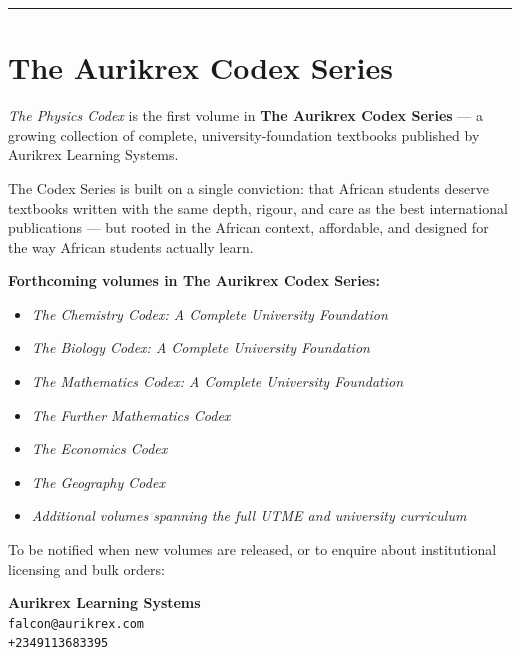 \vspace{1cm}
\color{codexblue}\rule{\textwidth}{0.5pt}
\vspace{0.5cm}


\section*{The Aurikrex Codex Series}

\textit{The Physics Codex} is the first volume in
\textbf{The Aurikrex Codex Series} --- a growing collection
of complete, university-foundation textbooks published by
Aurikrex Learning Systems.

The Codex Series is built on a single conviction: that
African students deserve textbooks written with the same
depth, rigour, and care as the best international publications
--- but rooted in the African context, affordable, and
designed for the way African students actually learn.

\vspace{0.3cm}

\textbf{Forthcoming volumes in The Aurikrex Codex Series:}

\begin{itemize}
  \item \textit{The Chemistry Codex: A Complete University
  Foundation}
  \item \textit{The Biology Codex: A Complete University
  Foundation}
  \item \textit{The Mathematics Codex: A Complete University
  Foundation}
  \item \textit{The Further Mathematics Codex}
  \item \textit{The Economics Codex}
  \item \textit{The Geography Codex}
  \item \textit{Additional volumes spanning the full
  UTME and university curriculum}
\end{itemize}

\vspace{0.5cm}

To be notified when new volumes are released, or to
enquire about institutional licensing and bulk orders:

\begin{center}
\textbf{Aurikrex Learning Systems}\\
\texttt{falcon@aurikrex.com}\\
\texttt{+2349113683395}
\end{center}
